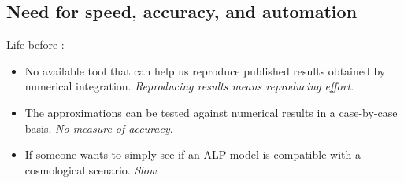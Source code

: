 \documentclass[10pt,utf8,compress,xcolor=dvipsnames]{beamer}
\begin{document}
\subsection{Need for speed, accuracy, and automation}
\begin{frame}{\insertsubsectionhead}
	Life before \mimes: \\[1cm]\pause
	\begin{itemize}
		\item No available tool that can help us reproduce published results obtained by numerical integration. \emph{Reproducing results means reproducing effort}.\pause
		\item The approximations can be tested against numerical results in a case-by-case basis. \emph{No measure of accuracy}.\pause%
		\item If someone wants to simply see if an ALP model is compatible with a cosmological scenario. \emph{Slow}. 
	\end{itemize}
	
	
	
\end{frame}




\section{\mimes}
\end{document}
